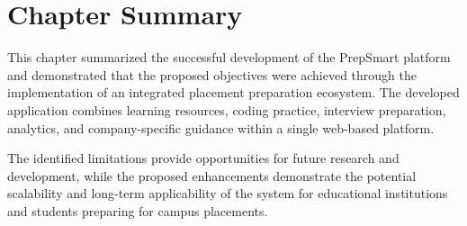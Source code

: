 \section{Chapter Summary}

This chapter summarized the successful development of the PrepSmart platform and demonstrated that the proposed objectives were achieved through the implementation of an integrated placement preparation ecosystem. The developed application combines learning resources, coding practice, interview preparation, analytics, and company-specific guidance within a single web-based platform.

The identified limitations provide opportunities for future research and development, while the proposed enhancements demonstrate the potential scalability and long-term applicability of the system for educational institutions and students preparing for campus placements.

